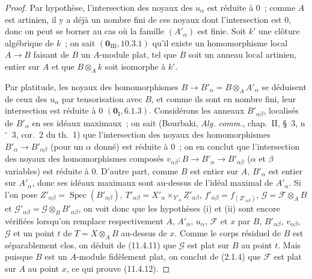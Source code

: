 \begin{proof}
Par hypothèse, l'intersection des noyaux des $u_\alpha$ est réduite à $0$~;
comme $A$ est artinien, il y a déjà un nombre fini de ces noyaux dont
l'intersection est $0$, donc on peut se borner au cas où la famille
$(A'_\alpha)$ est finie. Soit $k'$ une clôture algébrique de $k$~; on sait
$(\mathbf 0_{\mathrm{III}},10.3.1)$ qu'il existe un homomorphisme local
$A\to B$ faisant de $B$ un $A$-module plat, tel que $B$ soit un anneau local
artinien, entier sur $A$ et que $B\otimes_A k$ soit isomorphe à $k'$.

Par platitude, les noyaux des homomorphismes
$B\to B'_\alpha=B\otimes_A A'_\alpha$ se déduisent de ceux des $u_\alpha$ par
tensorisation avec $B$, et comme ils sont en nombre fini, leur intersection est
réduite à $0$ $(\mathbf 0_{\mathrm I},6.1.3)$. Considérons les anneaux
$B'_{\alpha\beta}$, localisés de $B'_\alpha$ en ses idéaux maximaux~; on sait
(Bourbaki, \emph{Alg. comm.}, chap.~II, \S~3, n$^\circ$~3, cor.~2 du th.~1)
que l'intersection des noyaux des homomorphismes
$B'_\alpha\to B'_{\alpha\beta}$ (pour un $\alpha$ donné) est réduite à $0$~;
on en conclut que l'intersection des noyaux des homomorphismes composés
$v_{\alpha\beta}:B\to B'_\alpha\to B'_{\alpha\beta}$ ($\alpha$ et $\beta$
variables) est réduite à $0$. D'autre part, comme $B$ est entier sur $A$,
$B'_\alpha$ est entier sur $A'_\alpha$, donc ses idéaux maximaux sont au-dessus
de l'idéal maximal de $A'_\alpha$. Si l'on pose
$Z'_{\alpha\beta}=\operatorname{Spec}(B'_{\alpha\beta})$,
$T'_{\alpha\beta}=X'_\alpha\times_{Y'_\alpha}Z'_{\alpha\beta}$,
$f'_{\alpha\beta}=f_{(Z'_{\alpha\beta})}$,
$\mathcal G=\mathcal F\otimes_A B$ et
$\mathcal G'_{\alpha\beta}=\mathcal G\otimes_B B'_{\alpha\beta}$, on voit donc
que les hypothèses (i) et (ii) sont encore vérifiées lorsqu'on remplace
respectivement $A$, $A'_\alpha$, $u_\alpha$, $\mathcal F$ et $x$ par $B$,
$B'_{\alpha\beta}$, $v_{\alpha\beta}$, $\mathcal G$ et un point $t$ de
$T=X\otimes_A B$ au-dessus de $x$. Comme le corps résiduel de $B$ est
séparablement clos, on déduit de (11.4.11) que $\mathcal G$ est plat sur $B$ au
point $t$. Mais puisque $B$ est un $A$-module fidèlement plat, on conclut de
(2.1.4) que $\mathcal F$ est plat sur $A$ au point $x$, ce qui prouve (11.4.12).
\end{proof}

